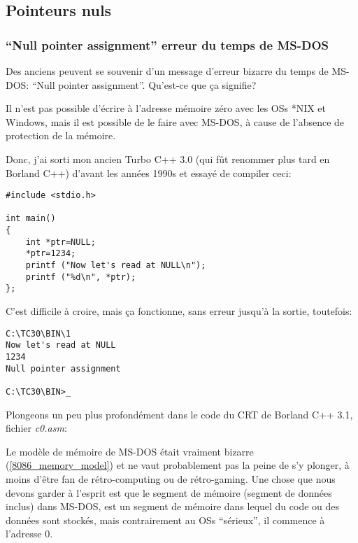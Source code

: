 \subsection{Pointeurs nuls}

\subsubsection{``Null pointer assignment'' erreur du temps de MS-DOS}

Des anciens peuvent se souvenir d'un message d'erreur bizarre du temps de MS-DOS:
``Null pointer assignment''.
Qu'est-ce que ça signifie?

Il n'est pas possible d'écrire à l'adresse mémoire zéro avec les OSs *NIX et Windows,
mais il est possible de le faire avec MS-DOS, à cause de l'absence de protection
de la mémoire.

Donc, j'ai sorti mon ancien Turbo C++ 3.0 (qui fût renommer plus tard en Borland C++)
d'avant les années 1990s et essayé de compiler ceci:

\begin{lstlisting}[style=customc]
#include <stdio.h>

int main()
{
	int *ptr=NULL;
	*ptr=1234;
	printf ("Now let's read at NULL\n");
	printf ("%d\n", *ptr);
};
\end{lstlisting}

C'est difficile à croire, mais ça fonctionne, sans erreur jusqu'à la sortie, toutefois:

\begin{lstlisting}[caption=Ancient Turbo C 3.0]
C:\TC30\BIN\1
Now let's read at NULL
1234
Null pointer assignment

C:\TC30\BIN>_
\end{lstlisting}

Plongeons un peu plus profondément dans le code du \ac{CRT} de Borland C++ 3.1, fichier \emph{c0.asm}:



Le modèle de mémoire de MS-DOS était vraiment bizarre (\ref{8086_memory_model}) et
ne vaut probablement pas la peine de s'y plonger, à moins d'être fan de rétro-computing
ou de rétro-gaming.
Une chose que nous devons garder à l'esprit est que le segment de mémoire (segment
de données inclus) dans MS-DOS, est un segment de mémoire dans lequel du code ou
des données sont stockés, mais contrairement au \ac{OS}s ``sérieux'', il commence
à l'adresse 0.

